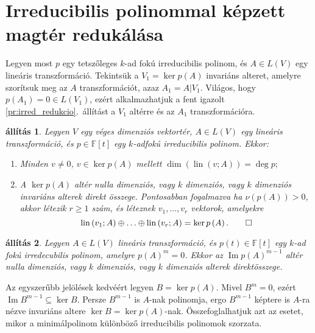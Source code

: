 \documentclass[9pt, a4paper, showtrims]{memoir}
\makeatletter
\renewenvironment{proof}[1][\proofname]
    {\par\pushQED{\qed}%
    \normalfont \topsep6\p@\@plus6\p@\relax
    \trivlist
    \item[\hskip\labelsep
        \itshape
    #1\@addpunct{:}]\ignorespaces}
    {\popQED\endtrivlist\@endpefalse}
\theoremstyle{plain}
\newtheorem{proposition}{állítás}[chapter]
\theoremstyle{remark}
\theoremstyle{definition}
\DeclareMathOperator{\lin}{lin}
\DeclareMathOperator{\im}{Im}
\makeatother
\begin{document}
\section{Irreducibilis polinommal képzett magtér redukálása}
Legyen most $p$ egy tetszőleges $k$-ad fokú irreducibilis polinom,
és $A\in L(V)$ egy lineáris transzformáció.
Tekintsük a $V_1=\ker p\left( A \right)$ invariáns alteret, amelyre szorítsuk meg az $A$
transzformációt, azaz $A_1=A|V_1$.
Világos, hogy $p\left( A_1 \right)=0\in L\left( V_1 \right)$,
ezért alkalmazhatjuk a fent igazolt \ref{pr:irred_redukcio}.~állítást
a $V_1$ altérre és az $A_1$ transzformációra.
\begin{proposition}\label{pr:csaba}
	Legyen $V$ egy véges dimenziós vektortér, $A\in L\left( V \right)$ egy lineáris transzformáció,
	és $p\in\mathbb{F}\left[ t \right]$ egy $k$-adfokú irreducibilis polinom.
	Ekkor:
	\begin{enumerate}
		\item Minden $v\neq 0$, $v\in\ker p\left( A \right)$ mellett
		      \(
		      \dim\left( \lin(v;A) \right)=\deg p;
		      \)
		\item A $\ker p\left( A \right)$ altér nulla dimenziós,
		      vagy $k$ dimenziós, vagy $k$ dimenziós invariáns alterek direkt összege.
		      Pontosabban fogalmazva
		      ha $\nu\left(p(A) \right)>0$, akkor létezik $r\geq 1$ szám,
		      és léteznek $v_1,\ldots,v_r$ vektorok, amelyekre
		      \[
			      \lin\left( v_1;A \right)\oplus\ldots\oplus \lin\left( v_r;A \right)
			      =
			      \ker p\left( A \right).
			      \qedhere
		      \]
	\end{enumerate}
\end{proposition}
\begin{proposition}
    Legyen $A\in L\left( V \right)$ lineáris transzformáció, és $p(t)\in\mathbb{F}[t]$ egy $k$-ad fokú 
    irredecubilis polinom,
    amelyre $p\left( A \right)^m=0$.
    Ekkor az $\im p\left( A \right)^{m-1}$ altér nulla dimenziós, 
    vagy $k$ dimenziós, vagy $k$ dimenziós alterek direktösszege.
\end{proposition}
\begin{proof}
    Az egyszerűbb jelölések kedvéért legyen $B=\ker p\left( A \right)$.
    Mivel $B^m=0$, ezért $\im B^{m-1}\subseteq\ker B $.
    Persze $B^{m-1}$ is $A$-nak polinomja, 
    ergo $B^{m-1}$ képtere is $A$-ra nézve invariáns altere $\ker B=\ker p\left( A \right)$-nak.
\end{proof}
Összefoglalhatjuk azt az esetet,
mikor a minimálpolinom különböző irreducibilis polinomok szorzata.
\end{document}
